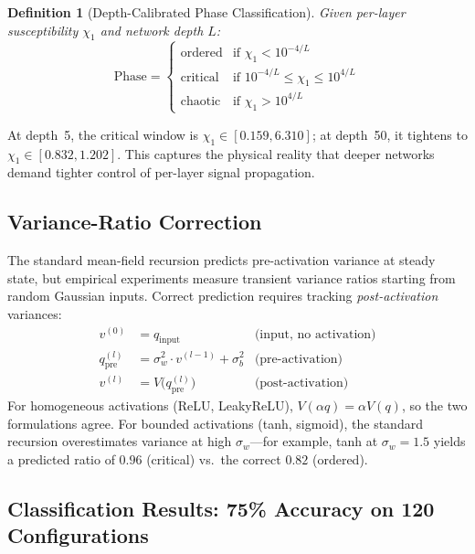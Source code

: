 \documentclass[10pt]{article}
\newtheorem{definition}[theorem]{Definition}
\begin{document}
\begin{definition}[Depth-Calibrated Phase Classification]
\label{def:depth-calibrated}
Given per-layer susceptibility $\chi_1$ and network depth $L$:
\begin{equation}
    \text{Phase} = \begin{cases}
        \text{ordered} & \text{if } \chi_1 < 10^{-4/L} \\
        \text{critical} & \text{if } 10^{-4/L} \leq \chi_1 \leq 10^{4/L} \\
        \text{chaotic} & \text{if } \chi_1 > 10^{4/L}
    \end{cases}
\end{equation}
\end{definition}

At depth~5, the critical window is $\chi_1 \in [0.159, 6.310]$; at depth~50, it tightens to $\chi_1 \in [0.832, 1.202]$.
This captures the physical reality that deeper networks demand tighter control of per-layer signal propagation.

\subsection{Variance-Ratio Correction}

The standard mean-field recursion predicts pre-activation variance at steady state, but empirical experiments measure transient variance ratios starting from random Gaussian inputs.
Correct prediction requires tracking \emph{post-activation} variances:
\begin{align}
    v^{(0)} &= q_{\mathrm{input}} & \text{(input, no activation)} \label{eq:post-act-init} \\
    q^{(l)}_{\mathrm{pre}} &= \sigma_w^2 \cdot v^{(l-1)} + \sigma_b^2 & \text{(pre-activation)} \label{eq:post-act-pre} \\
    v^{(l)} &= V\!\bigl(q^{(l)}_{\mathrm{pre}}\bigr) & \text{(post-activation)} \label{eq:post-act-post}
\end{align}
For homogeneous activations (ReLU, LeakyReLU), $V(\alpha q) = \alpha V(q)$, so the two formulations agree.
For bounded activations (tanh, sigmoid), the standard recursion overestimates variance at high $\sigma_w$---for example, tanh at $\sigma_w = 1.5$ yields a predicted ratio of $0.96$ (critical) vs.\ the correct $0.82$ (ordered).

\subsection{Classification Results: 75\% Accuracy on 120 Configurations}
\end{document}
